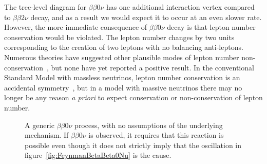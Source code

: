 The tree-level diagram for $\beta\beta 0\nu$ has one additional interaction vertex compared to $\beta\beta 2\nu$ decay, and as a result we would expect it to occur at an even slower rate.  However, the more immediate consequence of $\beta\beta 0\nu$ decay is that lepton number conservation would be violated.  The lepton number changes by two units corresponding to the creation of two leptons with no balancing anti-leptons.  Numerous theories have suggested other plausible modes of lepton number non-conservation~\cite{ProtonDecay,MuonToPositron}, but none have yet reported a positive result.  In the conventional Standard Model with massless neutrinos, lepton number conservation is an accidental symmetry~\cite{LeptonConservation}, but in a model with massive neutrinos there may no longer be any reason \textit{a priori} to expect conservation or non-conservation of lepton number.

\begin{figure}
\begin{center}
\end{center}
\caption{A generic $\beta\beta 0\nu$ process, with no assumptions of the underlying mechanism.  If $\beta\beta 0\nu$ is observed, it requires that this reaction is possible even though it does not strictly imply that the oscillation in figure~\ref{fig:FeynmanBetaBeta0Nu} is the cause.}
\label{fig:FeynmanBetaBeta0NuBlob}
\end{figure}

